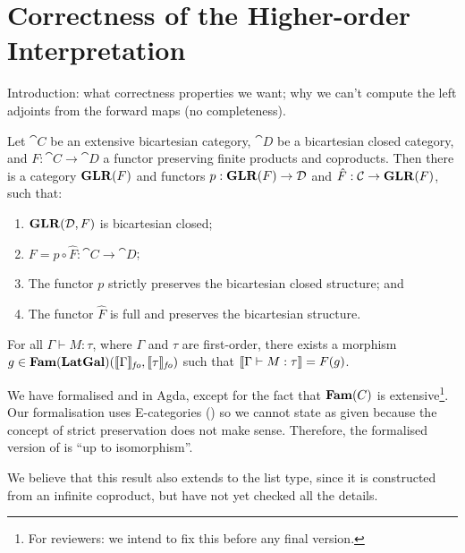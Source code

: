 \section{Correctness of the Higher-order Interpretation}
\label{sec:definability}

Introduction: what correctness properties we want; why we can't
compute the left adjoints from the forward maps (no completeness).

\begin{theorem}
  \label{thm:glr-definability}
  Let $\cat{C}$ be an extensive bicartesian category, $\cat{D}$ be a
  bicartesian closed category, and $F : \cat{C} \to \cat{D}$ a functor
  preserving finite products and coproducts. Then there is a category
  $\mathbf{GLR}(F)$ and functors $p : \mathbf{GLR}(F) \to \mathcal{D}$ and
  $\hat{F} : \mathcal{C} \to \mathbf{GLR}(F)$, such that:
  \begin{enumerate}
  \item $\mathbf{GLR}(\mathcal{D},F)$ is bicartesian closed;
  \item $F = p \circ \hat{F} : \cat{C} \to \cat{D}$;
  \item The functor $p$ strictly preserves the bicartesian closed structure; and
  \item The functor $\hat{F}$ is full and preserves the bicartesian structure.
  \end{enumerate}
\end{theorem}

\begin{theorem}
  \label{thm:language-definability}
  For all $\Gamma \vdash M : \tau$, where $\Gamma$ and $\tau$ are
  first-order, there exists a morphism
  $g \in \mathbf{Fam}(\mathbf{LatGal})(\llbracket \Gamma \rrbracket_{\mathit{fo}},
  \llbracket \tau \rrbracket_{\mathit{fo}})$ such that
  $\llbracket \Gamma \vdash M : \tau \rrbracket = F(g)$.
\end{theorem}

\begin{remark}
  We have formalised  and
   in Agda, except for the fact that
  $\mathbf{Fam}(C)$ is extensive\footnote{For reviewers: we intend to fix this
    before any final version.}. Our formalisation uses E-categories
  (\cite{palmgren-wilander}) so we cannot state
   as given because the concept of strict
  preservation does not make sense. Therefore, the formalised version
  of  is ``up to isomorphism''.

  We believe that this result also extends to the list type, since it
  is constructed from an infinite coproduct, but have not yet checked
  all the details.
\end{remark}

